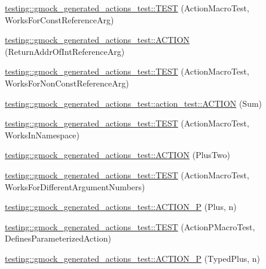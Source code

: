 \begin{DoxyCompactItemize}
\item 
\mbox{\hyperlink{namespacetesting_1_1gmock__generated__actions__test_a8b4dadfc32c71e754d6ba3daae382715}{testing\+::gmock\+\_\+generated\+\_\+actions\+\_\+test\+::\+T\+E\+ST}} (Action\+Macro\+Test, Works\+For\+Const\+Reference\+Arg)
\item 
\mbox{\hyperlink{namespacetesting_1_1gmock__generated__actions__test_aeb01205293078272696bd0c19ce4e848}{testing\+::gmock\+\_\+generated\+\_\+actions\+\_\+test\+::\+A\+C\+T\+I\+ON}} (Return\+Addr\+Of\+Int\+Reference\+Arg)
\item 
\mbox{\hyperlink{namespacetesting_1_1gmock__generated__actions__test_a093a824ac7e8ec775a8f5d7b11d223a9}{testing\+::gmock\+\_\+generated\+\_\+actions\+\_\+test\+::\+T\+E\+ST}} (Action\+Macro\+Test, Works\+For\+Non\+Const\+Reference\+Arg)
\item 
\mbox{\hyperlink{namespacetesting_1_1gmock__generated__actions__test_1_1action__test_a78d00ea4fff98d5cd3f73f8f03800bbe}{testing\+::gmock\+\_\+generated\+\_\+actions\+\_\+test\+::action\+\_\+test\+::\+A\+C\+T\+I\+ON}} (Sum)
\item 
\mbox{\hyperlink{namespacetesting_1_1gmock__generated__actions__test_af75a9a5b9d6a1cf718a58f030a5a9133}{testing\+::gmock\+\_\+generated\+\_\+actions\+\_\+test\+::\+T\+E\+ST}} (Action\+Macro\+Test, Works\+In\+Namespace)
\item 
\mbox{\hyperlink{namespacetesting_1_1gmock__generated__actions__test_a0eef2f885ccb1e4fac88a910f0fc5c2e}{testing\+::gmock\+\_\+generated\+\_\+actions\+\_\+test\+::\+A\+C\+T\+I\+ON}} (Plus\+Two)
\item 
\mbox{\hyperlink{namespacetesting_1_1gmock__generated__actions__test_acb98f6208678d9f5500a0c2c095b8cd0}{testing\+::gmock\+\_\+generated\+\_\+actions\+\_\+test\+::\+T\+E\+ST}} (Action\+Macro\+Test, Works\+For\+Different\+Argument\+Numbers)
\item 
\mbox{\hyperlink{namespacetesting_1_1gmock__generated__actions__test_ac081154b3ae2f099bd5be853cacfdaa4}{testing\+::gmock\+\_\+generated\+\_\+actions\+\_\+test\+::\+A\+C\+T\+I\+O\+N\+\_\+P}} (Plus, n)
\item 
\mbox{\hyperlink{namespacetesting_1_1gmock__generated__actions__test_a42a5fe606ca18b2eb1e5d7884045118f}{testing\+::gmock\+\_\+generated\+\_\+actions\+\_\+test\+::\+T\+E\+ST}} (Action\+P\+Macro\+Test, Defines\+Parameterized\+Action)
\item 
\mbox{\hyperlink{namespacetesting_1_1gmock__generated__actions__test_a3bcd440e11ab64ad5eb007efce33cf7d}{testing\+::gmock\+\_\+generated\+\_\+actions\+\_\+test\+::\+A\+C\+T\+I\+O\+N\+\_\+P}} (Typed\+Plus, n)

\end{DoxyCompactItemize}
